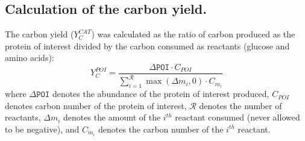 \documentclass[journal=asbcd6,manuscript=article]{achemso}
\begin{document}
%
%
%

\subsection*{Calculation of the carbon yield.}
The carbon yield ($Y_{C}^{CAT}$) was calculated as the ratio of carbon produced as the protein of interest divided by the carbon consumed as reactants (glucose and amino acids):
\begin{equation}\label{eqn:yield-definition}
	Y_{C}^{POI}=\frac{\Delta\texttt{POI}\cdot C_{POI}}{\displaystyle\sum_{i=1}^{\mathcal{R}}\max(\Delta m_{i},0)\cdot C_{m_i}}
\end{equation}
where $\Delta\texttt{POI}$ denotes the abundance of the protein of interest produced, $C_{POI}$ denotes carbon number of the protein of interest, $\mathcal{R}$ denotes the number of reactants,
$\Delta m_{i}$ denotes the amount of the $i^{th}$ reactant consumed (never allowed to be negative), and $C_{m_i}$ denotes the carbon number of the $i^{th}$ reactant.
\end{document}
